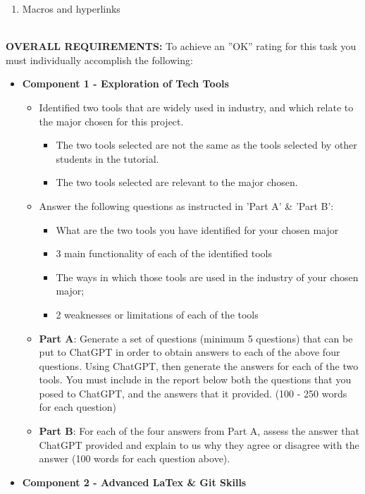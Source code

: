 \documentclass[a4paper, 11pt]{report}
\begin{document}
{\begin{enumerate}
\begin{enumerate}
	\item Macros and hyperlinks
	\end{enumerate}
\end{enumerate}
~\\[2mm]
\textbf{OVERALL REQUIREMENTS:}
To achieve an ''OK'' rating for this task you must individually accomplish the following:
\begin{itemize}
\item \textbf{Component 1 - Exploration of Tech Tools}
	\begin{itemize}
	\item Identified two tools that are widely used in industry, and which relate to the major chosen for this project.
		\begin{itemize}
		\item The two tools selected are not the same as the tools selected by other students in the tutorial. 
		\item The two tools selected are relevant to the major chosen.
		\end{itemize}
	\item Answer the following questions as instructed in 'Part A' \& 'Part B':
		\begin{itemize}
		\item What are the two tools you have identified for your chosen major
		\item 3 main functionality of each of the identified tools
		\item The ways in which those tools are used in the industry of your chosen major;
		\item 2 weaknesses or limitations of each of the tools
		\end{itemize}
	\item \textbf{Part A}: Generate a set of questions (minimum 5 questions) that can be put to ChatGPT in order to obtain answers to each of the above four questions. Using ChatGPT, then generate the answers for each of the two tools. You must include in the report below both the questions that you posed to ChatGPT, and the answers that it provided. (100 - 250 words for each question)
	\item \textbf{Part B}: For each of the four answers from Part A, assess the answer that ChatGPT provided and explain to us why they agree or disagree with the answer (100 words for each question above).
	\end{itemize}
\item \textbf{Component 2 - Advanced LaTex \& Git Skills}
	\begin{itemize}

\end{itemize}
\end{itemize}}
\end{document}
